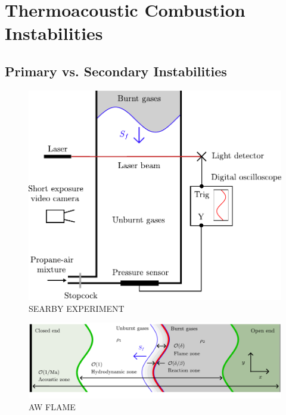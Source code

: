 \section{Thermoacoustic Combustion Instabilities}


\subsection{Primary vs. Secondary Instabilities}


\begin{figure}[t]
\centering
\includegraphics[scale=0.6]{assets/imgs/Searby-92.pdf}
\caption{SEARBY EXPERIMENT}
\label{fig:searby-experiment}
\end{figure}

\begin{figure}[t]
\centering
\includegraphics[scale=0.6]{assets/imgs/AW-flame.pdf}
\caption{AW FLAME}
\label{fig:AW-flame}
\end{figure}
    
        


